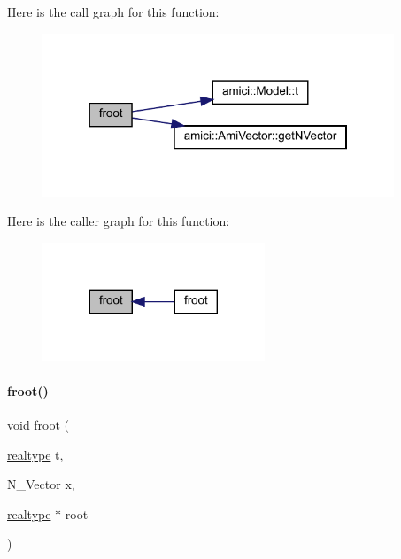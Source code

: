 Here is the call graph for this function\+:
\nopagebreak
\begin{figure}[H]
\begin{center}
\leavevmode
\includegraphics[width=298pt]{classamici_1_1_model___o_d_e_a94a623b51fd0ecd7a9a549eb7da2fc04_cgraph}
\end{center}
\end{figure}
Here is the caller graph for this function\+:
\nopagebreak
\begin{figure}[H]
\begin{center}
\leavevmode
\includegraphics[width=188pt]{classamici_1_1_model___o_d_e_a94a623b51fd0ecd7a9a549eb7da2fc04_icgraph}
\end{center}
\end{figure}
\mbox{\label{classamici_1_1_model___o_d_e_ab76d051378cedaaeffa04f18c00e79cb}} 
\paragraph{\texorpdfstring{froot()}{froot()}\hspace{0.1cm}{\footnotesize\ttfamily [2/3]}}
{\footnotesize\ttfamily void froot (\begin{DoxyParamCaption}\item[{\mbox{\hyperlink{namespaceamici_a1bdce28051d6a53868f7ccbf5f2c14a3}{realtype}}}]{t,  }\item[{N\+\_\+\+Vector}]{x,  }\item[{\mbox{\hyperlink{namespaceamici_a1bdce28051d6a53868f7ccbf5f2c14a3}{realtype}} $\ast$}]{root }\end{DoxyParamCaption})}


